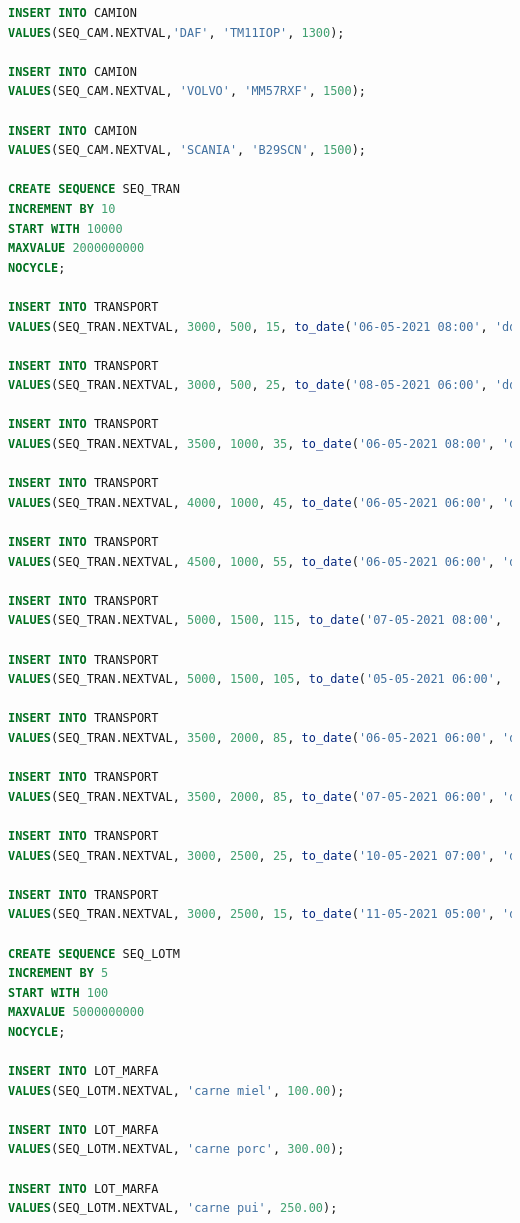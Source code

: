 \documentclass[12pt, a4paper]{article}
\begin{document}
\begin{lstlisting}[language=SQL]
INSERT INTO CAMION
VALUES(SEQ_CAM.NEXTVAL,'DAF', 'TM11IOP', 1300);

INSERT INTO CAMION
VALUES(SEQ_CAM.NEXTVAL, 'VOLVO', 'MM57RXF', 1500);

INSERT INTO CAMION
VALUES(SEQ_CAM.NEXTVAL, 'SCANIA', 'B29SCN', 1500);

CREATE SEQUENCE SEQ_TRAN
INCREMENT BY 10
START WITH 10000
MAXVALUE 2000000000
NOCYCLE;

INSERT INTO TRANSPORT
VALUES(SEQ_TRAN.NEXTVAL, 3000, 500, 15, to_date('06-05-2021 08:00', 'dd-mm-yyyy, hh24:mi'));

INSERT INTO TRANSPORT
VALUES(SEQ_TRAN.NEXTVAL, 3000, 500, 25, to_date('08-05-2021 06:00', 'dd-mm-yyyy, hh24:mi'));

INSERT INTO TRANSPORT
VALUES(SEQ_TRAN.NEXTVAL, 3500, 1000, 35, to_date('06-05-2021 08:00', 'dd-mm-yyyy, hh24:mi'));

INSERT INTO TRANSPORT
VALUES(SEQ_TRAN.NEXTVAL, 4000, 1000, 45, to_date('06-05-2021 06:00', 'dd-mm-yyyy, hh24:mi'));

INSERT INTO TRANSPORT
VALUES(SEQ_TRAN.NEXTVAL, 4500, 1000, 55, to_date('06-05-2021 06:00', 'dd-mm-yyyy, hh24:mi'));

INSERT INTO TRANSPORT
VALUES(SEQ_TRAN.NEXTVAL, 5000, 1500, 115, to_date('07-05-2021 08:00', 'dd-mm-yyyy, hh24:mi'));

INSERT INTO TRANSPORT
VALUES(SEQ_TRAN.NEXTVAL, 5000, 1500, 105, to_date('05-05-2021 06:00', 'dd-mm-yyyy, hh24:mi'));

INSERT INTO TRANSPORT
VALUES(SEQ_TRAN.NEXTVAL, 3500, 2000, 85, to_date('06-05-2021 06:00', 'dd-mm-yyyy, hh24:mi'));

INSERT INTO TRANSPORT
VALUES(SEQ_TRAN.NEXTVAL, 3500, 2000, 85, to_date('07-05-2021 06:00', 'dd-mm-yyyy, hh24:mi'));

INSERT INTO TRANSPORT
VALUES(SEQ_TRAN.NEXTVAL, 3000, 2500, 25, to_date('10-05-2021 07:00', 'dd-mm-yyyy, hh24:mi'));

INSERT INTO TRANSPORT
VALUES(SEQ_TRAN.NEXTVAL, 3000, 2500, 15, to_date('11-05-2021 05:00', 'dd-mm-yyyy, hh24:mi'));

CREATE SEQUENCE SEQ_LOTM
INCREMENT BY 5
START WITH 100
MAXVALUE 5000000000
NOCYCLE;

INSERT INTO LOT_MARFA
VALUES(SEQ_LOTM.NEXTVAL, 'carne miel', 100.00);

INSERT INTO LOT_MARFA
VALUES(SEQ_LOTM.NEXTVAL, 'carne porc', 300.00);

INSERT INTO LOT_MARFA
VALUES(SEQ_LOTM.NEXTVAL, 'carne pui', 250.00);


\end{lstlisting}
\end{document}
